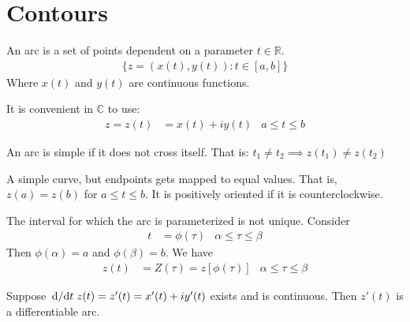 \documentclass[12pt, english]{book}
\begin{document}
	\section{Contours} \label{Contours Section - Complex}
	
	\begin{definition}[Arc]
		\label{Arc Definition - Complex}
		An arc is a set of points dependent on a parameter \(t \in \mathbb{R}\).
		\begin{align*}
			\{z = (x(t),y(t)) : t \in [a,b]\}
		\end{align*}
		Where \(x(t)\) and \(y(t)\) are continuous functions. 
	\end{definition}
	It is convenient in \(\mathbb{C}\) to use: 
	\begin{align*}
		 z = z(t) &= x(t) + iy(t)  & a \leq t \leq b
	\end{align*}
	
	\begin{definition}
		 
		\label{Simple/Jordan Arc Definition - Complex}
		An arc is simple if it does not cross itself. That is:
		\(t_1 \neq t_2 \implies z(t_1) \neq z(t_2)\)
	\end{definition}
	
	\begin{definition}
		 
		A simple curve, but endpoints gets mapped to equal values. That is, \(z(a) = z(b)\) for \(a \leq t \leq b\).
		It is positively oriented if it is counterclockwise. 
	\end{definition}

	The interval for which the arc is parameterized is not unique. Consider 
	\begin{align*}
		t &= \phi(\tau) & \alpha \leq \tau \leq \beta
	\end{align*}
	Then \(\phi(\alpha) = a\) and \(\phi(\beta)=b\). We have 
	\begin{align*}
		z(t) &= Z(\tau) = z[\phi(\tau)]& \alpha \leq \tau \leq \beta
	\end{align*}
	
	\begin{definition}
		\label{Differentiable Arc Definition - Complex}
		Suppose \(\dv*{t}z(t) = z'(t) = x'(t) + iy'(t)\) exists and is continuous. Then \(z'(t)\) is a differentiable arc.
	\end{definition}
	
\end{document}
